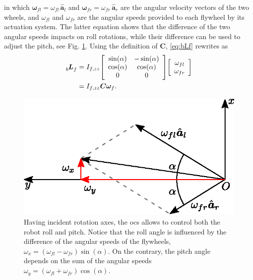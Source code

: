 \documentclass[sensors,article,submit,pdftex,moreauthors]{Definitions/mdpi}
\begin{document}
in which $\bm{\omega}_{fl}= \omega_{fl} \, \hat{\bm{a}}_{l}$ and $\bm{\omega}_{fr}= \omega_{fr} \, \hat{\bm{a}}_{r}$ are the angular velocity vectors of the two wheels, and $\omega_{fl}$ and $\omega_{fr}$ are the angular speeds provided to each flywheel by its actuation system. The latter equation shows that the difference of the two angular speeds impacts on roll rotations, while their difference can be used to adjust the pitch, see Fig. \ref{fig:sum-diff}. Using the definition of $\bm{C}$, \eqref{eq:bLf} rewrites as
\begin{equation}
\begin{split}
\tensor[_b]{\bm{L}}{_f} & = I_{f,zz}
\left[
\begin{array}{cc}
\sin(\alpha) & -\sin(\alpha) \\
\cos(\alpha) & \cos(\alpha) \\
0 & 0
\end{array}
\right]
\left[
\begin{array}{cc}
\omega_{fl} \\
\omega_{fr}
\end{array}
\right] \\
&= I_{f,zz} \bm{C} \bm{\omega}_f.
\end{split}
\end{equation}
\begin{figure}
	\centering
	\includegraphics[width=.7\linewidth]{figures/sum_diff_mod.eps}
	\caption{\small Having incident rotation axes, the \gls{ocs} allows to control both the robot roll and pitch. Notice that the roll angle is influenced by the difference of the angular speeds of the flywheels, $\omega_x = \left(\omega_{fl} - \omega_{fr}\right)\sin(\alpha)$. On the contrary, the pitch angle depends on the sum of the angular speeds $\omega_y = \left(\omega_{fl} +  \omega_{fr}\right)\cos(\alpha)$.}
	\label{fig:sum-diff}
\end{figure}
\end{document}
